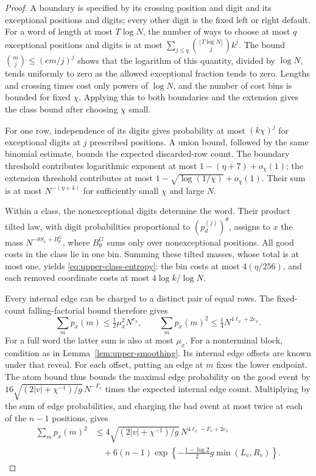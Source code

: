 \documentclass[11pt]{article}
\numberwithin{equation}{section}
\theoremstyle{definition}
\theoremstyle{remark}
\newcommand{\1}{\mathbf 1}
\begin{document}
\begin{proof}
A boundary is specified by its crossing position and digit and its
exceptional positions and digits; every other digit is the fixed
left or right default. For a word of length at most $T\log N$,
the number of ways to choose at most $q$ exceptional positions and
digits is at most $\sum_{j\le q}\binom{\lfloor T\log N\rfloor}j k^j$.
The bound $\binom mj\le(em/j)^j$ shows that the logarithm of this
quantity, divided by $\log N$, tends uniformly to zero as the
allowed exceptional fraction tends to zero. Lengths and crossing
times cost only powers of $\log N$, and the number of cost bins
is bounded for fixed $\chi$. Applying this to both boundaries and
the extension gives the class bound after choosing $\chi$ small.

For one row, independence of its digits gives probability at most
$(k\chi)^j$ for exceptional digits at $j$ prescribed positions.
A union bound, followed by the same binomial estimate, bounds the
expected discarded-row count. The boundary threshold contributes
logarithmic exponent at most $1-(\eta+7)+o_\chi(1)$; the extension
threshold contributes at most
$1-\sqrt{\log(1/\chi)}+o_\chi(1)$. Their sum is at most
$N^{-(\eta+4)}$ for sufficiently small $\chi$ and large $N$.

Within a class, the nonexceptional digits determine the word.
Their product tilted law, with digit probabilities proportional to
$(p_d^{(j)})^\theta$, assigns to $x$ the mass
$N^{-\theta S_x+B^G_\theta}$, where $B^G_\theta$ sums only over
nonexceptional positions. All good costs in the class lie in one
bin. Summing these tilted masses, whose total is at most one, yields
\eqref{eq:upper-class-entropy}: the bin costs at most $4(\eta/256)$,
and each removed coordinate costs at most $4\log k/\log N$.

Every internal edge can be charged to a distinct pair of equal rows.
The fixed-count falling-factorial bound therefore gives
\[
 \sum_m p_x(m)\le\tfrac12\mu_x^2N^{e_x},\qquad
 \sum_m p_x(m)^2\le\tfrac14 N^{4\ell_x+2e_x}.
\]
For a full word the latter sum is also at most $\mu_x$.
For a nonterminal block, condition as in
Lemma~\ref{lem:upper-smoothing}. Its internal edge offsets are known
under that reveal. For each offset, putting an edge at $m$ fixes
the lower endpoint. The atom bound thus bounds the maximal edge
probability on the good event by
$16\sqrt{(2|v|+\chi^{-1})/g}\,N^{-F_v}$ times the expected internal
edge count. Multiplying by the sum of edge probabilities, and
charging the bad event at most twice at each of the $n-1$ positions,
gives
\begin{align*}
 \sum_m p_x(m)^2
 &\le4\sqrt{(2|v|+\chi^{-1})/g}\,N^{4\ell_x-F_v+2e_x}\\
 &\quad+6(n-1)\exp\left\{-\frac{1-\log2}{2}g\min(L_v,R_v)\right\}.
\end{align*}


\end{proof}
\end{document}
